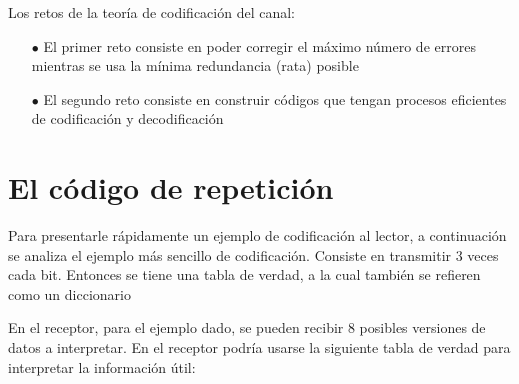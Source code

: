 Los retos de la teoría de codificación del canal:
\begin{itemize}
	\item [$\bullet$] El primer reto consiste en poder corregir el máximo número de errores mientras se usa la mínima redundancia (rata) posible
	\item [$\bullet$] El segundo reto consiste en construir códigos que tengan procesos eficientes de codificación y decodificación
\end{itemize}

\section{El código de repetición }

Para presentarle rápidamente un ejemplo de codificación al lector, a continuación se analiza el ejemplo más sencillo de codificación. Consiste en transmitir 3 veces cada bit. Entonces se tiene una tabla de verdad, a la cual también se refieren como un diccionario

	\begin{table}[h!]
		\captionsetup{justification = raggedright,singlelinecheck = false}
		\caption{Alguna descripción.}
		\label{tabla:tabla10}
		\centering
	\end{table}

En el receptor, para el ejemplo dado, se pueden recibir 8 posibles versiones de datos a interpretar. En el receptor podría usarse la siguiente tabla de verdad para interpretar la información útil:

